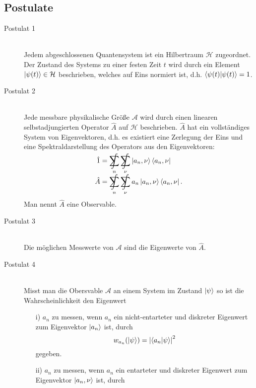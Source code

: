 \documentclass[11pt]{article}
\DeclareMathOperator*{\SumInt}{%
\mathchoice%
  {\ooalign{$\displaystyle\sum$\cr\hidewidth$\displaystyle\int$\hidewidth\cr}}
  {\ooalign{\raisebox{.14\height}{\scalebox{.7}{$\textstyle\sum$}}\cr\hidewidth$\textstyle\int$\hidewidth\cr}}
  {\ooalign{\raisebox{.2\height}{\scalebox{.6}{$\scriptstyle\sum$}}\cr$\scriptstyle\int$\cr}}
  {\ooalign{\raisebox{.2\height}{\scalebox{.6}{$\scriptstyle\sum$}}\cr$\scriptstyle\int$\cr}}
}
\numberwithin{equation}{section}
\begin{document}
		\subsection{Postulate}
			\begin{description} %
				\item[Postulat 1]\hfill \\
					Jedem abgeschlossenen Quantensystem ist ein Hilbertraum $\mathcal{H}$ zugeordnet. Der Zustand des Systems zu einer festen Zeit $t$ wird durch ein Element $\Ket{\psi(t)} \in \mathcal{H}$ beschrieben, welches auf Eins normiert ist, d.h. $\braket{\psi(t)|\psi(t)} = 1$.
				\item[Postulat 2]\hfill \\
					Jede messbare physikalische Größe $\mathcal{A}$ wird durch einen linearen selbstadjungierten Operator $\hat{A}$ auf $\mathcal{H}$ beschrieben. $\hat{A}$ hat ein vollständiges System von Eigenvektoren, d.h. es existiert eine Zerlegung der Eins und eine Spektraldarstellung des Operators aus den Eigenvektoren:
					\begin{equation}
						\begin{aligned}
							\hat{1} &= \SumInt_n \SumInt_\nu \Ket{a_n,\nu}\Bra{a_n,\nu} \\
							\hat{A} &= \SumInt_n \SumInt_\nu a_n\Ket{a_n,\nu}\Bra{a_n,\nu}. \\
						\end{aligned}
					\end{equation}
					Man nennt $\hat{A}$ eine Observable.
				\item[Postulat 3]\hfill \\
					Die möglichen Messwerte von $\mathcal{A}$ sind die Eigenwerte von $\hat{A}$.
				\item[Postulat 4]\hfill \\
					Misst man die Obersvable $\mathcal{A}$ an einem System im Zustand $\Ket{\psi}$ so ist die Wahrscheinlichkeit den Eigenwert
					\begin{itemize}
						\item[i)] $a_n$ zu messen, wenn $a_n$ ein nicht-entarteter und diskreter Eigenwert zum Eigenvektor $\Ket{a_n}$ ist, durch
						\begin{equation}
							w_{a_n}(\Ket{\psi}) = \left| \braket{a_n|\psi} \right|^2
						\end{equation}
						gegeben.
						\item[ii)] $a_n$ zu messen, wenn $a_n$ ein entarteter und diskreter Eigenwert zum Eigenvektor $\Ket{a_n,\nu}$ ist, durch

\end{itemize}
\end{description}
\end{document}
